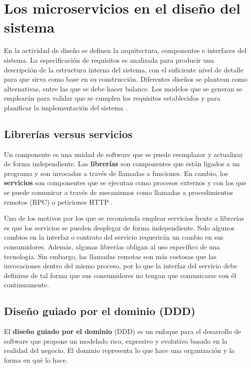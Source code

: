 \documentclass[11pt,spanish,listoffigures]{tfgetsinf}
\begin{document}
\section{Los microservicios en el diseño del sistema} \label{sct:FaseDiseño}

En la actividad de diseño se definen la arquitectura, componentes e interfaces del sistema. La especificación de requisitos es analizada para producir una descripción de la estructura interna del sistema, con el suficiente nivel de detalle para que sirva como base en su construcción. Diferentes diseños se plantean como alternativas, entre las que se debe hacer balance. Los modelos que se generan se emplearán para validar que se cumplen los requisitos establecidos y para planificar la implementación del sistema \cite{Bourque2014}.

\subsection{Librerías versus servicios} \label{subsect:librerias}

Un componente es una unidad de software que se puede reemplazar y actualizar de forma independiente. Las \textbf{librerías} son componentes que están ligados a un programa y son invocadas a través de llamadas a funciones. En cambio, los \textbf{servicios} son componentes que se ejecutan como procesos externos y con los que se puede comunicar a través de mecanismos como llamadas a procedimientos remotos (RPC) o peticiones HTTP \cite{Lewis2014}.

Uno de los motivos por los que se recomienda emplear servicios frente a librerías es que los servicios se pueden desplegar de forma independiente. Solo algunos cambios en la interfaz o contrato del servicio requerirán un cambio en sus consumidores. Además, algunas librerías obligan al uso específico de una tecnología. Sin embargo, las llamadas remotas son más costosas que las invocaciones dentro del mismo proceso, por lo que la interfaz del servicio debe definirse de tal forma que sus consumidores no tengan que comunicarse con él continuamente.

\subsection{Diseño guiado por el dominio (DDD)}

El \textbf{diseño guiado por el dominio} (DDD) \cite{Vaughn2013} es un enfoque para el desarrollo de software que propone un modelado rico, expresivo y evolutivo basado en la realidad del negocio. El dominio representa lo que hace una organización y la forma en qué lo hace.
\end{document}
